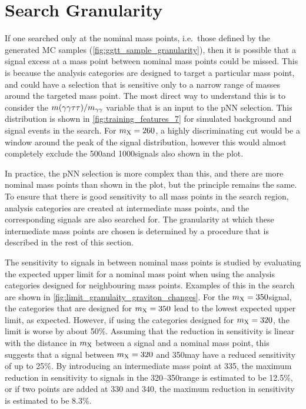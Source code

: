 \section{Search Granularity}\label{sec:search_granularity}

If one searched only at the nominal mass points, i.e.\ those defined by the generated MC samples (\cref{fig:ggtt_sample_granularity}), then it is possible that a signal excess at a mass point between nominal mass points could be missed. This is because the analysis categories are designed to target a particular mass point, and could have a selection that is sensitive only to a narrow range of masses around the targeted mass point. The most direct way to understand this is to consider the $m(\gamma\gamma\tau\tau)/m_{\gamma\gamma}$ variable that is an input to the pNN selection. This distribution is shown in \cref{fig:training_features_7} for simulated background and signal events in the \XTwoHH search. For $m_{\mathrm{X}}=260$\GeV, a highly discriminating cut would be a window around the peak of the signal distribution, however this would almost completely exclude the 500\GeV and 1000\GeV signals also shown in the plot.

In practice, the pNN selection is more complex than this, and there are more nominal mass points than shown in the plot, but the principle remains the same. To ensure that there is good sensitivity to all mass points in the search region, analysis categories are created at intermediate mass points, and the corresponding signals are also searched for. The granularity at which these intermediate mass points are chosen is determined by a procedure that is described in the rest of this section. 

The sensitivity to signals in between nominal mass points is studied by evaluating the expected upper limit for a nominal mass point when using the analysis categories designed for neighbouring mass points. Examples of this in the \XTwoHH search are shown in \cref{fig:limit_granulaity_graviton_changes}. For the $m_{\mathrm{X}}=350$\GeV signal, the categories that are designed for $m_{\mathrm{X}}=350$ lead to the lowest expected upper limit, as expected. However, if using the categories designed for $m_{\mathrm{X}}=320$\GeV, the limit is worse by about 50\%. Assuming that the reduction in sensitivity is linear with the distance in $m_{\mathrm{X}}$ between a signal and a nominal mass point, this suggests that a signal between $m_{\mathrm{X}}=320$ and 350\GeV may have a reduced sensitivity of up to 25\%. By introducing an intermediate mass point at 335\GeV, the maximum reduction in sensitivity to signals in the 320--350\GeV range is estimated to be 12.5\%, or if two points are added at 330 and 340\GeV, the maximum reduction in sensitivity is estimated to be 8.3\%. 


